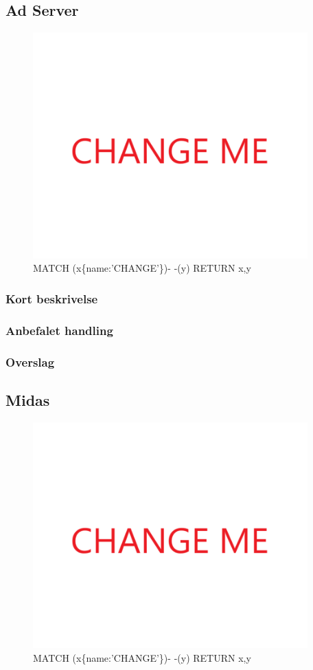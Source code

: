 \documentclass{article}
\begin{document}
\subsection{Ad Server}
\begin{figure}[h]
\includegraphics[width=300pt]{CHANGE.PNG}
\caption{MATCH (x\{name:'CHANGE'\})- -(y) RETURN x,y}
\end{figure}
\subsubsection{Kort beskrivelse}
\subsubsection{Anbefalet handling}
\subsubsection{Overslag}
\subsection{Midas}
\begin{figure}[h]
\includegraphics[width=300pt]{CHANGE.PNG}
\caption{MATCH (x\{name:'CHANGE'\})- -(y) RETURN x,y}
\end{figure}
\end{document}
